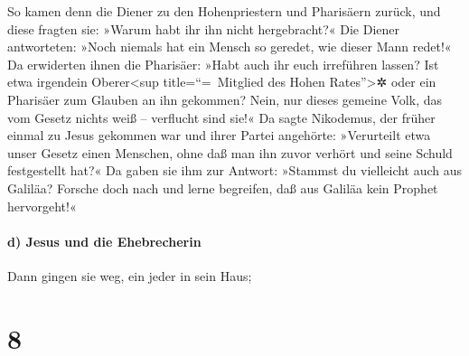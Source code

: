  So kamen denn die Diener zu den Hohenpriestern und
Pharisäern zurück, und diese fragten sie: »Warum habt ihr ihn nicht
hergebracht?«  Die Diener antworteten: »Noch niemals hat
ein Mensch so geredet, wie dieser Mann redet!«  Da
erwiderten ihnen die Pharisäer: »Habt auch ihr euch irreführen lassen?
 Ist etwa irgendein Oberer\textless sup
title=``=~Mitglied des Hohen Rates''\textgreater✲ oder ein Pharisäer zum
Glauben an ihn gekommen?  Nein, nur dieses gemeine Volk,
das vom Gesetz nichts weiß -- verflucht sind sie!«  Da
sagte Nikodemus, der früher einmal zu Jesus gekommen war und ihrer
Partei angehörte:  »Verurteilt etwa unser Gesetz einen
Menschen, ohne daß man ihn zuvor verhört und seine Schuld festgestellt
hat?«  Da gaben sie ihm zur Antwort: »Stammst du
vielleicht auch aus Galiläa? Forsche doch nach und lerne begreifen, daß
aus Galiläa kein Prophet hervorgeht!«

\hypertarget{d-jesus-und-die-ehebrecherin}{%
\paragraph{d) Jesus und die
Ehebrecherin}\label{d-jesus-und-die-ehebrecherin}}

 Dann gingen sie weg, ein jeder in sein Haus;

\hypertarget{section-7}{%
\section{8}\label{section-7}}

